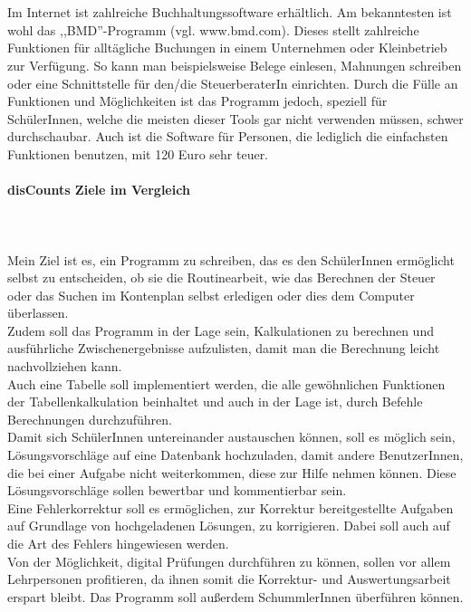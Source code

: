 \documentclass[12pt]{report}
\begin{document}
\noindent \\\\Im Internet ist zahlreiche Buchhaltungssoftware erhältlich. Am bekanntesten ist wohl das ,,BMD''-Programm (vgl. www.bmd.com). Dieses stellt zahlreiche Funktionen für alltägliche Buchungen in einem Unternehmen oder Kleinbetrieb zur Verfügung. So kann man beispielsweise Belege einlesen, Mahnungen schreiben oder eine Schnittstelle für den/die SteuerberaterIn einrichten. Durch die Fülle an Funktionen und Möglichkeiten ist das Programm jedoch, speziell für SchülerInnen, welche die meisten dieser Tools gar nicht verwenden müssen, schwer durchschaubar. Auch ist die Software für Personen, die lediglich die einfachsten Funktionen benutzen, mit 120 Euro sehr teuer.  \newline

\paragraph{disCounts Ziele im Vergleich}  

\noindent \\\\Mein Ziel ist es, ein Programm zu schreiben, das es den SchülerInnen ermöglicht selbst zu entscheiden, ob sie die Routinearbeit, wie das Berechnen der Steuer oder das Suchen im Kontenplan selbst erledigen oder dies dem Computer überlassen.\\
Zudem soll das Programm in der Lage sein, Kalkulationen zu berechnen und ausführliche Zwischenergebnisse aufzulisten, damit man die Berechnung leicht nachvollziehen kann.\\
Auch eine Tabelle soll implementiert werden, die alle gewöhnlichen Funktionen der Tabellenkalkulation beinhaltet und auch in der Lage ist, durch Befehle Berechnungen durchzuführen.\\
Damit sich SchülerInnen untereinander austauschen können, soll es möglich sein, Lösungsvorschläge auf eine Datenbank hochzuladen, damit andere BenutzerInnen, die bei einer Aufgabe nicht weiterkommen, diese zur Hilfe nehmen können. Diese Lösungsvorschläge sollen bewertbar und kommentierbar sein.\\
Eine Fehlerkorrektur soll es ermöglichen, zur Korrektur bereitgestellte Aufgaben auf Grundlage von hochgeladenen Lösungen, zu korrigieren. Dabei soll auch auf die Art des Fehlers hingewiesen werden.\\
Von der Möglichkeit, digital Prüfungen durchführen zu können, sollen vor allem Lehrpersonen profitieren, da ihnen somit die Korrektur- und Auswertungsarbeit erspart bleibt. Das Programm soll außerdem SchummlerInnen überführen können.
\end{document}
